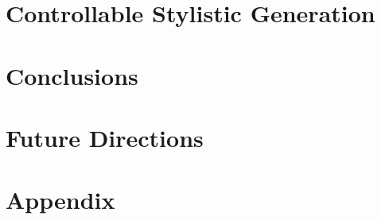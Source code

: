 \documentclass[ twoside,
openright,
titlepage,
numbers=noenddot,%
                headinclude,
                footinclude,
                cleardoublepage=empty,
                abstract=on,
                BCOR=5mm,
                paper=letter,
                fontsize=12pt
                ]{scrreprt}
\begin{document}
\ctparttext{
    \lipsum[3]
}

\chapter{Controllable Stylistic Generation}\label{chp:control_gen}





\chapter{Conclusions}
\label{chp:concl}

\chapter{Future Directions}
\label{chp:future}


\ctparttext{
    \lipsum[3]
}
% 
\appendix
\cleardoublepage
\chapter{Appendix}

\cleardoublepage
\end{document}
